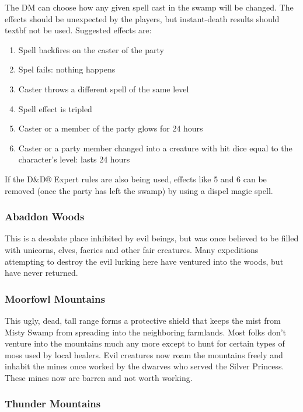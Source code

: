 \documentclass[palace_of_the_silver_princess]{subfiles}
\begin{document}
The DM can choose how any given spell cast in the swamp will be changed.
The effects should be unexpected by the players, but instant-death
results should {textbf not} be used. Suggested effects are:

\begin{enumerate}
	\item Spell backfires on the caster of the party
	\item Spel fails: nothing happens
	\item Caster throws a different spell of the same level
	\item Spell effect is tripled
	\item Caster or a member of the party glows for 24 hours
	\item Caster or a party member changed into a creature with hit dice
		equal to the character’s level: lasts 24 hours
\end{enumerate}

If the D\&D® Expert rules are also being used, effects like 5 and 6 can
be removed (once the party has left the swamp) by using a dispel magic
spell.

\subsubsection{Abaddon Woods}

This is a desolate place inhibited by evil beings, but was once believed
to be filled with unicorns, elves, faeries and other fair creatures.
Many expeditions attempting to destroy the evil lurking here have
ventured into the woods, but have never returned.

\subsubsection{Moorfowl Mountains}

This ugly, dead, tall range forms a protective shield that keeps the
mist from Misty Swamp from spreading into the neighboring farmlands.
Most folks don’t venture into the mountains much any more except to hunt
for certain types of moss used by local healers. Evil creatures now roam
the mountains freely and inhabit the mines once worked by the dwarves
who served the Silver Princess. These mines now are barren and not worth
working.

\subsubsection{Thunder Mountains}
\end{document}
